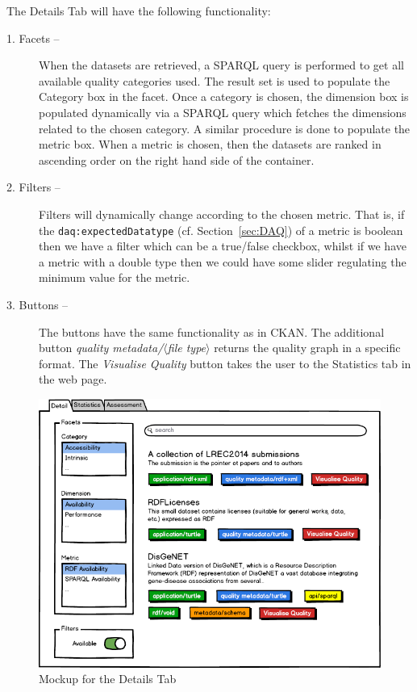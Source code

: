 The Details Tab will have the following functionality:
\begin{description}
\item [1. Facets –]
When the datasets are retrieved, a SPARQL query is performed to get all available quality categories used. 
The result set is used to populate the Category box in the facet. 
Once a category is chosen, the dimension box is populated dynamically via a SPARQL query which fetches the dimensions related to the chosen category. 
A similar procedure is done to populate the metric box. 
When a metric is chosen, then the datasets are ranked in ascending order on the right hand side of the container.
\item [2. Filters –]
Filters will dynamically change according to the chosen metric. 
That is, if the \texttt{daq:expectedDatatype} (cf. Section~\ref{sec:DAQ}) of a metric is boolean then we have a filter which can be a true/false checkbox, whilst if we have a metric with a double type then we could have some slider regulating the minimum value for the metric.
\item [3. Buttons –]
The buttons have the same functionality as in CKAN. 
The additional button \emph{quality metadata/$\langle$file type$\rangle$} returns the quality graph in a specific format. 
The \emph{Visualise Quality} button takes the user to the Statistics tab in the web page.
\end{description}

\begin{figure}[tbph]
\center
\includegraphics[width=\textwidth]{images/uiDetailsTab.png} 
\caption{Mockup for the Details Tab} 
\label{fig:uiDetailsTab}
\end{figure}

